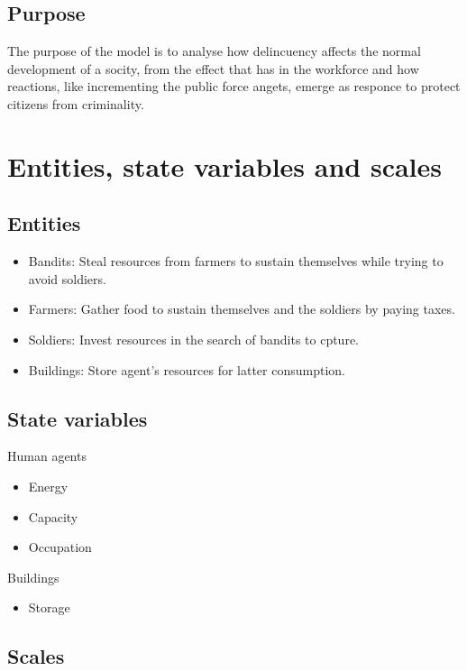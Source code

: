 \documentclass{wscpaperproc}
\theoremstyle{wsc}
\begin{document}
\subsection{Purpose}

The purpose of the model is to analyse how delincuency affects the normal development of a socity,
from the effect that has in the workforce and how reactions, like incrementing the public force
angets, emerge as responce to protect citizens from criminality.

\section{Entities, state variables and scales}

\subsection{Entities}

\begin{itemize}
    \item Bandits: Steal resources from farmers to sustain themselves while trying to avoid soldiers.
    \item Farmers: Gather food to sustain themselves and the soldiers by paying taxes.
    \item Soldiers: Invest resources in the search of bandits to cpture.
    \item Buildings: Store agent's resources for latter consumption.
\end{itemize}

\subsection{State variables}

Human agents

\begin{itemize}
    \item Energy
    \item Capacity
    \item Occupation
\end{itemize}

Buildings

\begin{itemize}
    \item Storage
\end{itemize}

\subsection{Scales}
\end{document}
